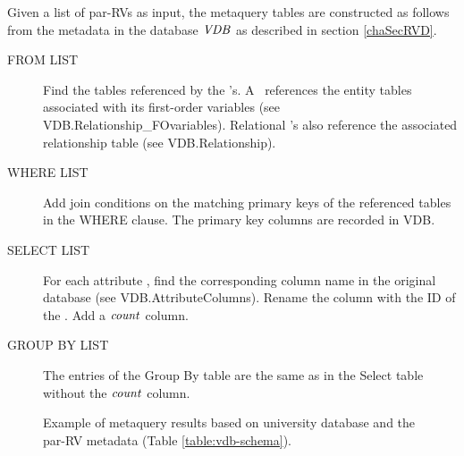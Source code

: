 \documentclass{sfuthesis}
\begin{document}
Given a list of par-RVs as input, the metaquery tables are constructed as follows from the metadata in the database ${\it VDB }$ as described in section \ref{chaSecRVD}.  
\begin{description}
\item[FROM LIST] Find the tables referenced by the \RRV's. A \RRV ~references the entity tables associated with its first-order variables (see VDB.Relationship\_FOvariables). Relational \RRV's also reference the associated relationship table (see VDB.Relationship). 
\item[WHERE LIST] Add join conditions on the matching primary keys of the referenced tables in the WHERE clause. The primary key columns are recorded in VDB. 
\item[SELECT LIST] For each attribute \RRV, find the corresponding column name in the original database (see VDB.AttributeColumns). Rename the column with the ID of the \RRV. Add a $\it{count}$ column.
\item[GROUP BY LIST] The entries of the Group By table are the same as in the Select table without the $\it{count}$ column.
\end{description}


\begin{figure}[htb]
\begin{center}
\caption{Example of metaquery results based on university database and the par-RV metadata (Table \ref{table:vdb-schema}).
~\label{fig:meta-query}}
\end{center}
\end{figure}
\end{document}
